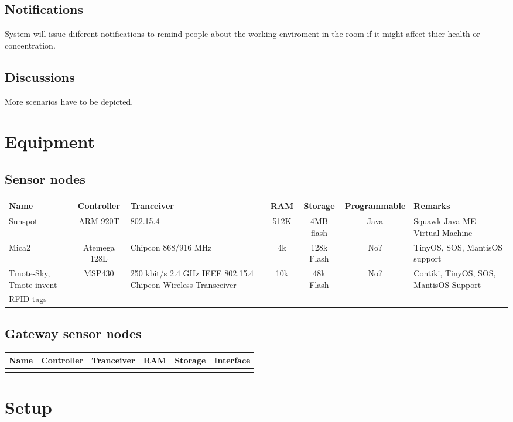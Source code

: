 \documentclass[a4paper, 12pt]{article}
\newcommand{\head}[1]{\textnormal {\textbf{#1}}}
\begin{document}
\subsection{Notifications}
 System will issue diiferent notifications to remind people about the working enviroment in the room if it might affect thier health or concentration.
\subsection{Discussions}
 More scenarios have to be depicted.
\section{Equipment}
\subsection{Sensor nodes}
\begin{tabular}{|p{2.5cm}|c|p{2cm}|c|c|c|p{2.5cm}|}
\hline
\head{Name} & \head{Controller} & \head{Tranceiver} & \head{RAM} & \head{Storage} &\head{Programmable} &\head{Remarks}\\
\hline
{Sunspot} & {ARM 920T} & {802.15.4} & {512K} & {4MB flash} & {Java } & {Squawk Java ME Virtual Machine} \\
\hline
{Mica2} & {Atemega 128L} & {Chipcon 868/916 MHz}& {4k} & {128k Flash} & {No?} & {TinyOS, SOS, MantisOS support} \\
\hline
{Tmote-Sky, Tmote-invent} & {MSP430} & {250 kbit/s 2.4 GHz IEEE 802.15.4 Chipcon Wireless Transceiver} & {10k} & {48k Flash} & {No?} & {Contiki, TinyOS, SOS, MantisOS Support}\\
\hline
{RFID tags} &{}&{}&{}&{}&{}&{}\\
\hline
\end{tabular}

\subsection{Gateway sensor nodes}

\begin{tabular}{|p{2.5cm}|c|p{2cm}|c|c|c|}
\hline
\head{Name} & \head{Controller} & \head{Tranceiver} & \head{RAM} & \head{Storage} &\head{Interface}\\
\hline
{} &{}&{}&{}&{}&{}\\
\hline
\end{tabular}

\section{Setup}
\end{document}
